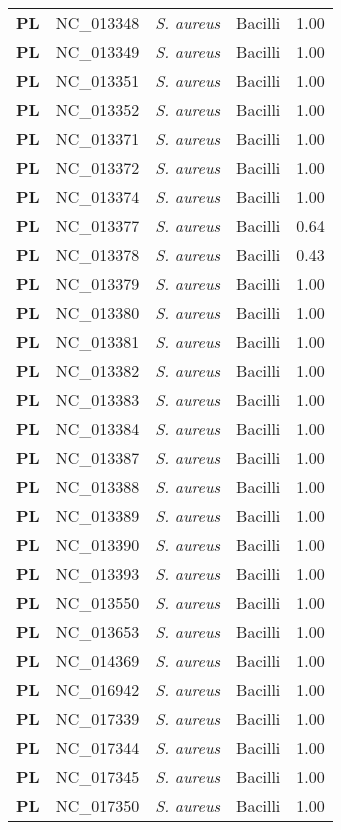 \begin{adjustwidth}{-3cm}{2cm}
{\begin{supertabular}{>{\bfseries}l|p{0.1\textwidth}p{0.14\textwidth}l|l}
PL & NC\_013348 & \textit{S. aureus} & Bacilli & 1.00\\
PL & NC\_013349 & \textit{S. aureus} & Bacilli & 1.00\\
PL & NC\_013351 & \textit{S. aureus} & Bacilli & 1.00\\
PL & NC\_013352 & \textit{S. aureus} & Bacilli & 1.00\\
PL & NC\_013371 & \textit{S. aureus} & Bacilli & 1.00\\
PL & NC\_013372 & \textit{S. aureus} & Bacilli & 1.00\\
PL & NC\_013374 & \textit{S. aureus} & Bacilli & 1.00\\
PL & NC\_013377 & \textit{S. aureus} & Bacilli & 0.64\\
PL & NC\_013378 & \textit{S. aureus} & Bacilli & 0.43\\
PL & NC\_013379 & \textit{S. aureus} & Bacilli & 1.00\\
PL & NC\_013380 & \textit{S. aureus} & Bacilli & 1.00\\
PL & NC\_013381 & \textit{S. aureus} & Bacilli & 1.00\\
PL & NC\_013382 & \textit{S. aureus} & Bacilli & 1.00\\
PL & NC\_013383 & \textit{S. aureus} & Bacilli & 1.00\\
PL & NC\_013384 & \textit{S. aureus} & Bacilli & 1.00\\
PL & NC\_013387 & \textit{S. aureus} & Bacilli & 1.00\\
PL & NC\_013388 & \textit{S. aureus} & Bacilli & 1.00\\
PL & NC\_013389 & \textit{S. aureus} & Bacilli & 1.00\\
PL & NC\_013390 & \textit{S. aureus} & Bacilli & 1.00\\
PL & NC\_013393 & \textit{S. aureus} & Bacilli & 1.00\\
PL & NC\_013550 & \textit{S. aureus} & Bacilli & 1.00\\
PL & NC\_013653 & \textit{S. aureus} & Bacilli & 1.00\\
PL & NC\_014369 & \textit{S. aureus} & Bacilli & 1.00\\
PL & NC\_016942 & \textit{S. aureus} & Bacilli & 1.00\\
PL & NC\_017339 & \textit{S. aureus} & Bacilli & 1.00\\
PL & NC\_017344 & \textit{S. aureus} & Bacilli & 1.00\\
PL & NC\_017345 & \textit{S. aureus} & Bacilli & 1.00\\
PL & NC\_017350 & \textit{S. aureus} & Bacilli & 1.00\\

\end{supertabular}}
\end{adjustwidth}
